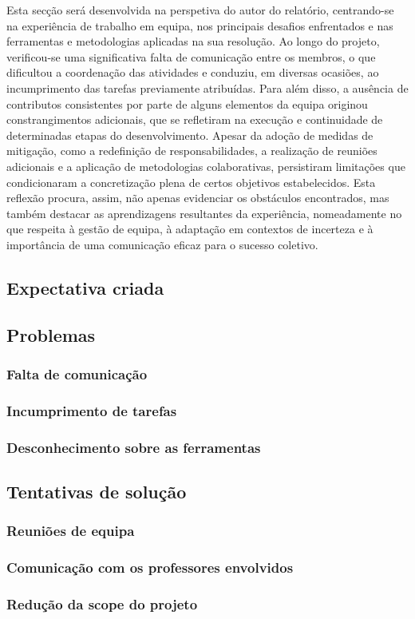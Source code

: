 Esta secção será desenvolvida na perspetiva do autor do relatório, centrando-se na experiência de trabalho em equipa, nos principais desafios enfrentados e nas ferramentas e metodologias aplicadas na sua resolução. Ao longo do projeto, verificou-se uma significativa falta de comunicação entre os membros, o que dificultou a coordenação das atividades e conduziu, em diversas ocasiões, ao incumprimento das tarefas previamente atribuídas. Para além disso, a ausência de contributos consistentes por parte de alguns elementos da equipa originou constrangimentos adicionais, que se refletiram na execução e continuidade de determinadas etapas do desenvolvimento. Apesar da adoção de medidas de mitigação, como a redefinição de responsabilidades, a realização de reuniões adicionais e a aplicação de metodologias colaborativas, persistiram limitações que condicionaram a concretização plena de certos objetivos estabelecidos. Esta reflexão procura, assim, não apenas evidenciar os obstáculos encontrados, mas também destacar as aprendizagens resultantes da experiência, nomeadamente no que respeita à gestão de equipa, à adaptação em contextos de incerteza e à importância de uma comunicação eficaz para o sucesso coletivo.

\subsection{Expectativa criada}



\subsection{Problemas}

\subsubsection{Falta de comunicação}

\subsubsection{Incumprimento de tarefas}

\subsubsection{Desconhecimento sobre as ferramentas}


\subsection{Tentativas de solução}

\subsubsection{Reuniões de equipa}

\subsubsection{Comunicação com os professores envolvidos}

\subsubsection{Redução da scope do projeto}
